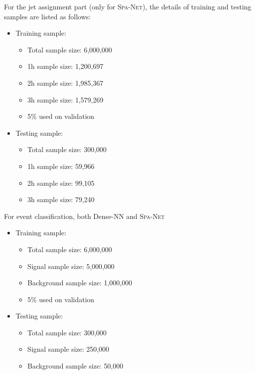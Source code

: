 \documentclass[12pt]{article}
\begin{document}
    For the jet assignment part (only for \textsc{Spa-Net}), the details of training and testing samples are listed as follows:
    \begin{itemize}
        \item Training sample:
        \begin{itemize}
            \item Total sample size: 6,000,000
            \item 1h sample size: 1,200,697
            \item 2h sample size: 1,985,367
            \item 3h sample size: 1,579,269         
            \item 5\% used on validation
        \end{itemize}
        \item Testing sample:
        \begin{itemize}
            \item Total sample size: 300,000
            \item 1h sample size: 59,966
            \item 2h sample size: 99,105
            \item 3h sample size: 79,240
        \end{itemize}
    \end{itemize}

    For event classification, both Dense-NN and \textsc{Spa-Net}
    \begin{itemize}
        \item Training sample:
        \begin{itemize}
            \item Total sample size: 6,000,000
            \item Signal sample size: 5,000,000
            \item Background sample size: 1,000,000
            \item 5\% used on validation
        \end{itemize}
        \item Testing sample:
        \begin{itemize}
            \item Total sample size: 300,000
            \item Signal sample size: 250,000
            \item Background sample size: 50,000
        \end{itemize}
    \end{itemize}
\end{document}
